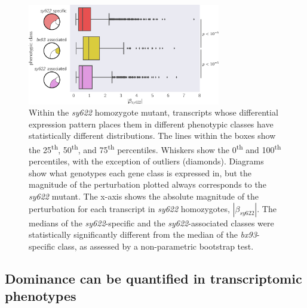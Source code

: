 \documentclass[10pt, twocolumn]{article}
\begin{document}
\begin{figure}
  \centering{}
  \includegraphics[width=0.75\textwidth]{../figs/dpy22_classes.pdf}
  \caption{
    Within the \emph{sy622} homozygote mutant, transcripts whose differential
    expression pattern places them in different phenotypic classes have
    statistically different distributions. The lines within the boxes show the
    25\textsuperscript{th}, 50\textsuperscript{th}, and 75\textsuperscript{th}
    percentiles. Whiskers show the 0\textsuperscript{th} and
    100\textsuperscript{th} percentiles, with the exception of outliers
    (diamonds). Diagrams show what genotypes each gene class is expressed in,
    but the magnitude of the perturbation plotted always corresponds to the
    \emph{sy622} mutant. The x-axis shows the absolute magnitude of the
    perturbation for each transcript in \emph{sy622} homozygotes,
    $|\beta_{sy622}|$. The medians of the \emph{sy622}-specific and the
    \emph{sy622}-associated classes were statistically significantly different
    from the median of the \emph{bx93}-specific class, as assessed by a
    non-parametric bootstrap test.
  }
\label{fig:classes}
\end{figure}

\subsection*{Dominance can be quantified in transcriptomic phenotypes}
\end{document}

